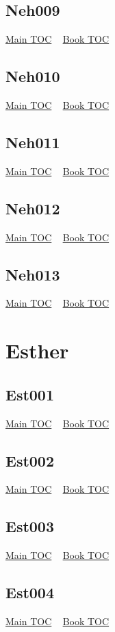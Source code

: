 \documentclass{book}
\begin{document}
  \section{Neh009}\hyperlink{toc}{Main TOC} ~ \hyperref[subsec:Neh]{Book TOC} 
  \section{Neh010}\hyperlink{toc}{Main TOC} ~ \hyperref[subsec:Neh]{Book TOC} 
  \section{Neh011}\hyperlink{toc}{Main TOC} ~ \hyperref[subsec:Neh]{Book TOC} 
  \section{Neh012}\hyperlink{toc}{Main TOC} ~ \hyperref[subsec:Neh]{Book TOC} 
  \section{Neh013}\hyperlink{toc}{Main TOC} ~ \hyperref[subsec:Neh]{Book TOC} 
  \chapter{Esther} \label{subsec:Est} \begin{multicols}{2} \minitoc \end{multicols}
  \section{Est001}\hyperlink{toc}{Main TOC} ~ \hyperref[subsec:Est]{Book TOC} 
  \section{Est002}\hyperlink{toc}{Main TOC} ~ \hyperref[subsec:Est]{Book TOC} 
  \section{Est003}\hyperlink{toc}{Main TOC} ~ \hyperref[subsec:Est]{Book TOC} 
  \section{Est004}\hyperlink{toc}{Main TOC} ~ \hyperref[subsec:Est]{Book TOC} 
\end{document}
